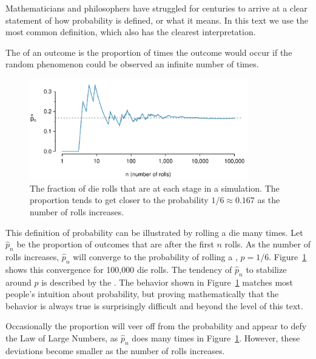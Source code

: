 Mathematicians and philosophers have struggled for centuries to arrive at a clear statement of how probability is defined, or what it means.  In this text we use the most common definition, which also has the clearest interpretation.

\begin{termBox}{
The  of an outcome is the proportion of times the outcome would occur if the random phenomenon could be observed an infinite number of times.}
\end{termBox}


\begin{figure}[bt]
	\centering
	\includegraphics[width=0.85\textwidth]{ch_probability_oi_biostat/figures/dieProp/dieProp}
	\caption{The fraction of die rolls that are  at each stage in a simulation. The proportion tends to get closer to the probability $1/6 \approx 0.167$ as the number of rolls increases.}
	\label{fig:dieProp}
\end{figure}

This definition of probability can be illustrated by rolling a die many times. Let $\hat{p}_n$ be the proportion of outcomes that are  after the first $n$ rolls. As the number of rolls increases, $\hat{p}_n$ will converge to the probability of rolling a , $p = 1/6$. Figure~\ref{fig:dieProp} shows this convergence for 100,000 die rolls. The tendency of $\hat{p}_n$ to stabilize around $p$ is described by the . The behavior shown in Figure~\ref{fig:dieProp} matches most people's intuition about probability, but proving mathematically that the behavior is always true is surprisingly difficult and beyond the level of this text.

Occasionally the proportion will veer off from the probability and appear to defy the Law of Large Numbers, as $\hat{p}_n$ does many times in Figure~\ref{fig:dieProp}. However, these deviations become smaller as the number of rolls increases.


